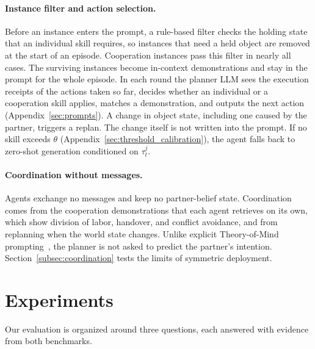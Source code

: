 \documentclass{article}
\theoremstyle{plain}
\theoremstyle{definition}
\theoremstyle{remark}
\begin{document}
\paragraph{Instance filter and action selection.}
Before an instance enters the prompt, a rule-based filter checks the holding state that an individual skill requires, so instances that need a held object are removed at the start of an episode. Cooperation instances pass this filter in nearly all cases. The surviving instances become in-context demonstrations and stay in the prompt for the whole episode. In each round the planner LLM sees the execution receipts of the actions taken so far, decides whether an individual or a cooperation skill applies, matches a demonstration, and outputs the next action (Appendix~\ref{sec:prompts}). A change in object state, including one caused by the partner, triggers a replan. The change itself is not written into the prompt. If no skill exceeds $\theta$ (Appendix~\ref{sec:threshold_calibration}), the agent falls back to zero-shot generation conditioned on $\tau_t^j$.
 
\paragraph{Coordination without messages.}
Agents exchange no messages and keep no partner-belief state. Coordination comes from the cooperation demonstrations that each agent retrieves on its own, which show division of labor, handover, and conflict avoidance, and from replanning when the world state changes. Unlike explicit Theory-of-Mind prompting~\citep{kosinski2023theory}, the planner is not asked to predict the partner's intention. Section~\ref{subsec:coordination} tests the limits of symmetric deployment.
 
 
\section{Experiments}
\label{sec:experiments}
Our evaluation is organized around three questions, each answered with evidence from both benchmarks.
 
\end{document}
